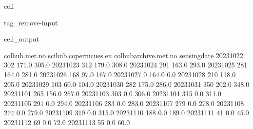\documentclass[letterpaper,10pt,english]{jupyterBook}
\begin{document}
\begin{sphinxuseclass}{cell}
\begin{sphinxuseclass}{tag_remove-input}\begin{sphinxVerbatimOutput}

\begin{sphinxuseclass}{cell_output}
\begin{sphinxVerbatim}[commandchars=\\\{\}]
              colhub.met.no  scihub.copernicues.eu  colhub\PYGZhy{}archive.met.no  \PYGZbs{}
sensing\PYGZus{}date                                                                
2023\PYGZhy{}10\PYGZhy{}22              302                  171.0                  305.0   
2023\PYGZhy{}10\PYGZhy{}23              312                  179.0                  308.0   
2023\PYGZhy{}10\PYGZhy{}24              291                  163.0                  293.0   
2023\PYGZhy{}10\PYGZhy{}25              281                  164.0                  281.0   
2023\PYGZhy{}10\PYGZhy{}26              168                   97.0                  167.0   
2023\PYGZhy{}10\PYGZhy{}27                0                  164.0                    0.0   
2023\PYGZhy{}10\PYGZhy{}28              210                  118.0                  205.0   
2023\PYGZhy{}10\PYGZhy{}29              103                   60.0                  104.0   
2023\PYGZhy{}10\PYGZhy{}30              282                  175.0                  286.0   
2023\PYGZhy{}10\PYGZhy{}31              350                  202.0                  348.0   
2023\PYGZhy{}11\PYGZhy{}01              265                  156.0                  267.0   
2023\PYGZhy{}11\PYGZhy{}03              303                    0.0                  306.0   
2023\PYGZhy{}11\PYGZhy{}04              315                    0.0                  311.0   
2023\PYGZhy{}11\PYGZhy{}05              291                    0.0                  294.0   
2023\PYGZhy{}11\PYGZhy{}06              283                    0.0                  283.0   
2023\PYGZhy{}11\PYGZhy{}07              279                    0.0                  278.0   
2023\PYGZhy{}11\PYGZhy{}08              274                    0.0                  279.0   
2023\PYGZhy{}11\PYGZhy{}09              319                    0.0                  315.0   
2023\PYGZhy{}11\PYGZhy{}10              188                    0.0                  189.0   
2023\PYGZhy{}11\PYGZhy{}11               41                    0.0                   45.0   
2023\PYGZhy{}11\PYGZhy{}12               69                    0.0                   72.0   
2023\PYGZhy{}11\PYGZhy{}13               55                    0.0                   60.0   

\end{sphinxVerbatim}
\end{sphinxuseclass}
\end{sphinxVerbatimOutput}
\end{sphinxuseclass}
\end{sphinxuseclass}
\end{document}
